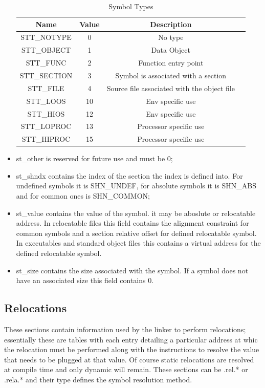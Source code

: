 \documentclass[paper=a4, fontsize=11pt]{report} %
\numberwithin{equation}{section} %
\numberwithin{figure}{section} %
\numberwithin{table}{section} %
\begin{document}
\begin{itemize}
	\begin{table}[!htbp]
		\begin{center}
			\begin{tabular}{|c|c|c|c|}
				\hline
				\textbf{Name} & \textbf{Value} & \textbf{Description}\\ 
				\hline
				{\ttfamily STT\_NOTYPE} & 0 & No type\\ \hline
				{\ttfamily STT\_OBJECT} & 1 & Data Object\\ \hline
				{\ttfamily STT\_FUNC} & 2 & Function entry point\\ \hline
				{\ttfamily STT\_SECTION} & 3 & Symbol is associated with a 
				section\\ \hline
				{\ttfamily STT\_FILE} & 4 & Source file associated with the 
				object file\\ \hline
				{\ttfamily STT\_LOOS} & 10 & Env specific use\\ \hline
				{\ttfamily STT\_HIOS} & 12 & Env specific use\\ \hline
				{\ttfamily STT\_LOPROC} & 13 & Processor specific use\\ \hline
				{\ttfamily STT\_HIPROC} & 15 & Processor specific use\\ \hline
			\end{tabular}
			\caption{Symbol Types}
			\label{types}
		\end{center}
	\end{table}
  \item {\ttfamily st\_other} is reserved for future use and must be 0;
	\item {\ttfamily st\_shndx} contains the index of the section the index is 
	defined into. For undefined symbols it is {\ttfamily SHN\_UNDEF}, for 
	absolute symbols it is {\ttfamily SHN\_ABS} and for common ones is 
	{\ttfamily SHN\_COMMON};
	\item {\ttfamily st\_value} contains the value of the symbol. it may be 
	aboslute or relocatable address. In relocatable files this field contains 
	the alignment constraint for common symbols and a section relative offset 
	for defined relocatable symbol. In executables and standard object files 
	this contains a virtual address for the defined relocatable symbol.
	\item {\ttfamily st\_size} contains the size associated with the symbol. If 
	a symbol does not have an associated size this field contains 0.
\end{itemize}
\subsection{Relocations}
These sections contain information used by the linker to perform relocations; 
essentially these are tables with each entry detailing a particular address at 
whic the relocation must be performed along with the instructions to resolve 
the value that needs to be plugged at that value. Of course static relocations 
are resolved at compile time and only dynamic will remain. 
These sections can be {\ttfamily .rel.*} or {\ttfamily .rela.*} and their type 
defines the symbol resolution method.
\end{document}
